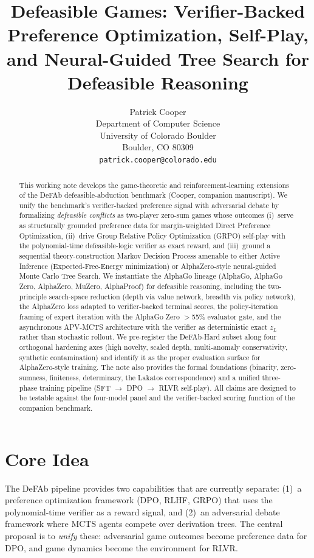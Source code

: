 \documentclass{article}
\title{Defeasible Games: Verifier-Backed Preference Optimization, Self-Play, and Neural-Guided Tree Search for Defeasible Reasoning}
\author{%
  Patrick Cooper \\
  Department of Computer Science\\
  University of Colorado Boulder\\
  Boulder, CO 80309 \\
  \texttt{patrick.cooper@colorado.edu} \\
}
\begin{document}
\maketitle

\begin{abstract}
This working note develops the game-theoretic and reinforcement-learning extensions of the DeFAb defeasible-abduction benchmark (Cooper, companion manuscript). We unify the benchmark's verifier-backed preference signal with adversarial debate by formalizing \emph{defeasible conflicts} as two-player zero-sum games whose outcomes (i)~serve as structurally grounded preference data for margin-weighted Direct Preference Optimization, (ii)~drive Group Relative Policy Optimization (GRPO) self-play with the polynomial-time defeasible-logic verifier as exact reward, and (iii)~ground a sequential theory-construction Markov Decision Process amenable to either Active Inference (Expected-Free-Energy minimization) or AlphaZero-style neural-guided Monte Carlo Tree Search. We instantiate the AlphaGo lineage (AlphaGo, AlphaGo Zero, AlphaZero, MuZero, AlphaProof) for defeasible reasoning, including the two-principle search-space reduction (depth via value network, breadth via policy network), the AlphaZero loss adapted to verifier-backed terminal scores, the policy-iteration framing of expert iteration with the AlphaGo Zero $>$55\% evaluator gate, and the asynchronous APV-MCTS architecture with the verifier as deterministic exact $z_L$ rather than stochastic rollout. We pre-register the DeFAb-Hard subset along four orthogonal hardening axes (high novelty, scaled depth, multi-anomaly conservativity, synthetic contamination) and identify it as the proper evaluation surface for AlphaZero-style training. The note also provides the formal foundations (binarity, zero-sumness, finiteness, determinacy, the Lakatos correspondence) and a unified three-phase training pipeline (SFT $\rightarrow$ DPO $\rightarrow$ RLVR self-play). All claims are designed to be testable against the four-model panel and the verifier-backed scoring function of the companion benchmark.
\end{abstract}


\section{Core Idea}

The DeFAb pipeline provides two capabilities that are currently separate: (1)~a preference optimization framework (DPO, RLHF, GRPO) that uses the polynomial-time verifier as a reward signal, and (2)~an adversarial debate framework where MCTS agents compete over derivation trees. The central proposal is to \emph{unify} these: adversarial game outcomes become preference data for DPO, and game dynamics become the environment for RLVR.
\end{document}
